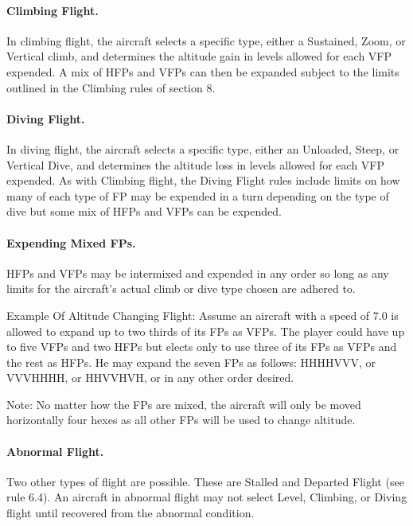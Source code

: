

\paragraph{Climbing Flight.} In climbing flight, the aircraft selects a specific type, either a Sustained, Zoom, or Vertical climb, and determines the altitude gain in levels allowed for each VFP expended. A mix of HFPs and VFPs can then be expanded subject to the limits outlined in the Climbing rules of section 8.

\paragraph{Diving Flight.} In diving flight, the aircraft selects a specific type, either an Unloaded, Steep, or Vertical Dive, and determines the altitude loss in levels allowed for each VFP expended. As with Climbing flight, the Diving Flight rules include limits on how many of each type of FP may be expended in a turn depending on the type of dive but some mix of HFPs and VFPs can be expended.

\paragraph{Expending Mixed FPs.} HFPs and VFPs may be intermixed and expended in any order so long as any limits for the aircraft's actual climb or dive type chosen are adhered to.

Example Of Altitude Changing Flight: Assume an aircraft with a speed of 7.0 is allowed to expand up to two thirds of its FPs as VFPs. The player could have up to five VFPs and two HFPs but elects only to use three of its FPs as VFPs and the rest as HFPs. He may expand the seven FPs as follows:
HHHHVVV, or VVVHHHH, or HHVVHVH, or in any other order desired.

Note: No matter how the FPs are mixed, the aircraft will only be moved horizontally four hexes as all other FPs will be used to change altitude.

\paragraph{Abnormal Flight.} Two other types of flight are possible. These are Stalled and Departed Flight (see rule 6.4).  An aircraft in abnormal flight may not select Level, Climbing, or Diving flight until recovered from the abnormal condition.


